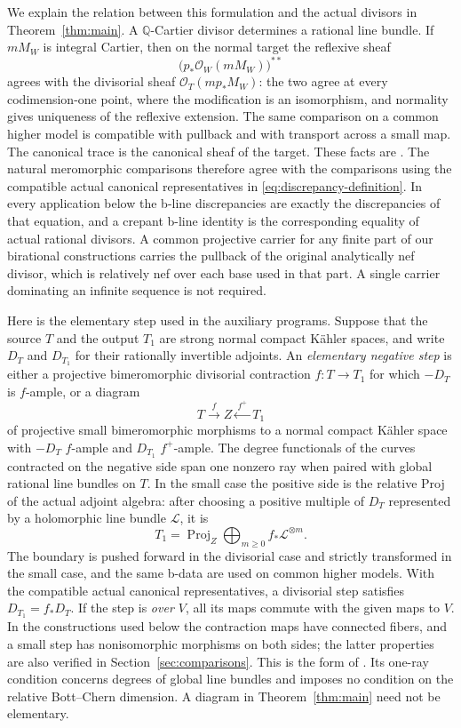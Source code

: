 \documentclass[11pt]{amsart}
\theoremstyle{definition}
\theoremstyle{remark}
\numberwithin{equation}{section}
\newcommand{\Q}{\mathbb{Q}}
\DeclareMathOperator{\Proj}{Proj}
\begin{document}
We explain the relation between this formulation and the actual divisors in
Theorem~\ref{thm:main}.  A \(\Q\)-Cartier divisor determines a rational
line bundle.  If \(mM_W\) is integral Cartier, then on the normal target
the reflexive sheaf
\[
 \bigl(p_*\mathcal O_W(mM_W)\bigr)^{**}
\]
agrees with the divisorial sheaf \(\mathcal O_T(mp_*M_W)\): the two agree
at every codimension-one point, where the modification is an isomorphism,
and normality gives uniqueness of the reflexive extension.  The same
comparison on a common higher model is compatible with pullback and with
transport across a small map.  The canonical trace is the canonical
sheaf of the target.  These facts are
\cite[Lemma~9.3(i)--(ii)]{KahlerAuxiliary}.  The natural meromorphic
comparisons therefore agree with the comparisons using the compatible
actual canonical representatives in \eqref{eq:discrepancy-definition}.
In every application below the b-line discrepancies are exactly the
discrepancies of that equation, and a crepant b-line identity is the
corresponding equality of actual rational divisors.  A common projective
carrier for any finite part of our birational constructions carries the
pullback of the original analytically nef divisor, which is relatively nef
over each base used in that part.  A single carrier dominating an infinite
sequence is not required.

Here is the elementary step used in the auxiliary programs.  Suppose that
the source \(T\) and the output \(T_1\) are strong normal compact K\"ahler
spaces, and write \(D_T\) and \(D_{T_1}\) for their rationally invertible
adjoints.  An \emph{elementary negative step} is either a projective
bimeromorphic divisorial contraction \(f:T\to T_1\) for which \(-D_T\)
is \(f\)-ample, or a diagram
\[
 T\xrightarrow{\ f\ }Z\xleftarrow{\ f^+\ }T_1
\]
of projective small bimeromorphic morphisms to a normal compact K\"ahler
space with \(-D_T\) \(f\)-ample and \(D_{T_1}\) \(f^+\)-ample.  The
degree functionals of the curves contracted on the negative side span one
nonzero ray when paired with global rational line bundles on \(T\).
In the small case the positive side is the relative Proj of the actual
adjoint algebra: after choosing a positive multiple of \(D_T\) represented
by a holomorphic line bundle \(\mathcal L\), it is
\[
 T_1=\Proj_Z\bigoplus_{m\geq0} f_*\mathcal L^{\otimes m}.
\]
The boundary is pushed forward in the divisorial case and strictly
transformed in the small case, and the same b-data are used on common higher
models.  With the compatible actual canonical representatives, a divisorial
step satisfies \(D_{T_1}=f_*D_T\).  If the step is \emph{over \(V\)}, all its maps commute with the
given maps to \(V\).  In the constructions used below the contraction maps
have connected fibers, and a small step has nonisomorphic morphisms on both
sides; the latter properties are also verified in
Section~\ref{sec:comparisons}.  This is the form of
\cite[Definition~9.6]{KahlerAuxiliary}.  Its one-ray condition concerns
degrees of global line bundles and imposes no condition on the relative
Bott--Chern dimension.  A diagram in Theorem~\ref{thm:main} need not be
elementary.
\end{document}
